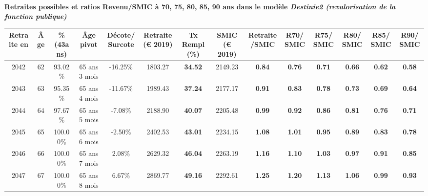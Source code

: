  \vspace{0.1cm} 
{\bf \noindent Retraites possibles et ratios Revenu/SMIC à 70, 75, 80, 85, 90 ans dans le modèle \emph{Destinie2 (revalorisation de la fonction publique)}}  
 
\begin{adjustbox}{max width=\textwidth} 
\begin{tabular}[htb]{|c|c||c|c|c||c|c||c|c||c|c|c|c|c|} 
\hline 
 Retraite en &  Âge &  \%(43ans) &  Âge pivot &  Décote/Surcote &  Retraite (\euro{} 2019) &  Tx Rempl(\%) &  SMIC (\euro{} 2019) &  Retraite/SMIC &  R70/SMIC &  R75/SMIC &  R80/SMIC &  R85/SMIC &  R90/SMIC \\ 
\hline \hline 
 2042 &  62 &  93.02\% &  65 ans 3 mois &  -16.25\% &  1803.27 &  {\bf 34.52} &  2149.23 &  {\bf {\color{red} 0.84}} &  {\bf {\color{red} 0.76}} &  {\bf {\color{red} 0.71}} &  {\bf {\color{red} 0.66}} &  {\bf {\color{red} 0.62}} &  {\bf {\color{red} 0.58}} \\ 
\hline 
 2043 &  63 &  95.35\% &  65 ans 4 mois &  -11.67\% &  1989.43 &  {\bf 37.24} &  2177.17 &  {\bf {\color{red} 0.91}} &  {\bf {\color{red} 0.83}} &  {\bf {\color{red} 0.78}} &  {\bf {\color{red} 0.73}} &  {\bf {\color{red} 0.69}} &  {\bf {\color{red} 0.64}} \\ 
\hline 
 2044 &  64 &  97.67\% &  65 ans 5 mois &  -7.08\% &  2188.90 &  {\bf 40.07} &  2205.48 &  {\bf {\color{red} 0.99}} &  {\bf {\color{red} 0.92}} &  {\bf {\color{red} 0.86}} &  {\bf {\color{red} 0.81}} &  {\bf {\color{red} 0.76}} &  {\bf {\color{red} 0.71}} \\ 
\hline 
 2045 &  65 &  100.00\% &  65 ans 6 mois &  -2.50\% &  2402.53 &  {\bf 43.01} &  2234.15 &  {\bf 1.08} &  {\bf 1.01} &  {\bf {\color{red} 0.95}} &  {\bf {\color{red} 0.89}} &  {\bf {\color{red} 0.83}} &  {\bf {\color{red} 0.78}} \\ 
\hline 
 2046 &  66 &  100.00\% &  65 ans 7 mois &  2.08\% &  2629.32 &  {\bf 46.04} &  2263.19 &  {\bf 1.16} &  {\bf 1.10} &  {\bf 1.03} &  {\bf {\color{red} 0.97}} &  {\bf {\color{red} 0.91}} &  {\bf {\color{red} 0.85}} \\ 
\hline 
 2047 &  67 &  100.00\% &  65 ans 8 mois &  6.67\% &  2869.77 &  {\bf 49.16} &  2292.61 &  {\bf 1.25} &  {\bf 1.20} &  {\bf 1.13} &  {\bf 1.06} &  {\bf {\color{red} 0.99}} &  {\bf {\color{red} 0.93}} \\ 
\hline 
\hline 
\end{tabular} 
\end{adjustbox} 
 
 \vspace{0.1cm} 

